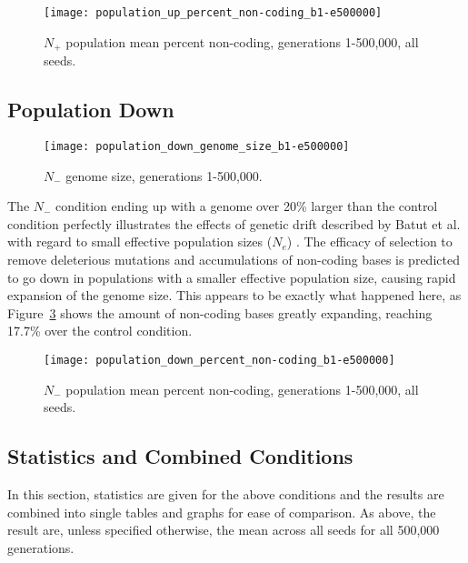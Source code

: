 \begin{figure}[H]
	\centering
	\texttt{[image: population\_up\_percent\_non-coding\_b1-e500000]}
	\caption[Population up percent non-coding]{$N_+$ population mean percent non-coding, generations 1-500,000, all seeds.}
	\label{fig:pop_up_perc_non-coding}
\end{figure}



\subsection{Population Down}

\begin{figure}[H]
	\centering
	\texttt{[image: population\_down\_genome\_size\_b1-e500000]}
	\caption[Population down genome size]{$N_-$ genome size, generations 1-500,000.}
	\label{fig:pop_down_genome_size}
\end{figure}

The $N_-$ condition ending up with a genome over 20\% larger than the control condition perfectly illustrates the effects of genetic drift described by Batut et al. with regard to small effective population sizes ($N_e$) \cite{Batut.2014}. The efficacy of selection to remove deleterious mutations and accumulations of non-coding bases is predicted to go down in populations with a smaller effective population size, causing rapid expansion of the genome size. This appears to be exactly what happened here, as Figure~\ref{fig:pop_down_perc_non-coding} shows the amount of non-coding bases greatly expanding, reaching 17.7\% over the control condition. 

\begin{figure}[H]
	\centering
	\texttt{[image: population\_down\_percent\_non-coding\_b1-e500000]}
	\caption[Population down percent non-coding]{$N_-$ population mean percent non-coding, generations 1-500,000, all seeds.}
	\label{fig:pop_down_perc_non-coding}
\end{figure}

\subsection{Statistics and Combined Conditions}\label{statistics}
In this section, statistics are given for the above conditions and the results are combined into single tables and graphs for ease of comparison. As above, the result are, unless specified otherwise, the mean across all seeds for all 500,000 generations.
